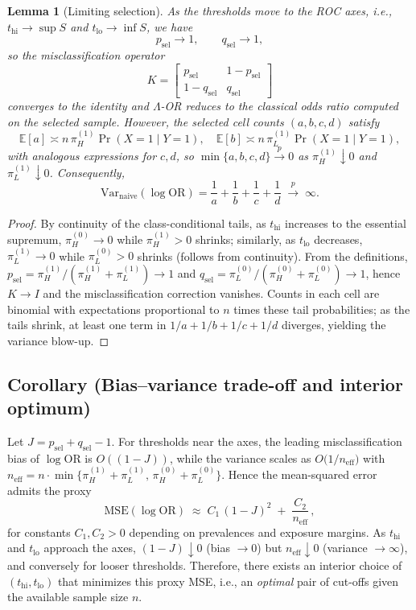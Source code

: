 \documentclass[pdflatex,sn-mathphys-num]{sn-jnl}%
\newtheorem{lem}{Lemma}
\theoremstyle{thmstyleone}%
\theoremstyle{thmstyletwo}%
\theoremstyle{thmstylethree}%
\begin{document}
\begin{lem}[Limiting selection]\label{lemsel}
As the thresholds move to the ROC axes, i.e., $t_{\mathrm{hi}}\!\to\!\sup S$ and $t_{\mathrm{lo}}\!\to\!\inf S$, we have
\[
p_{\text{sel}}\to 1,\qquad q_{\text{sel}}\to 1,
\]
so the misclassification operator
\[
K=\begin{bmatrix} p_{\text{sel}}&1-p_{\text{sel}}\\ 1-q_{\text{sel}}&q_{\text{sel}}\end{bmatrix}\]
converges to the identity and $\Lambda$-OR reduces to the classical odds ratio computed on the selected sample.
However, the selected cell counts $(a,b,c,d)$ satisfy
\[
\mathbb{E}[a]\asymp n\,\pi_H^{(1)}\Pr(X{=}1\mid Y{=}1),\quad
\mathbb{E}[b]\asymp n\,\pi_L^{(1)}\Pr(X{=}1\mid Y{=}1),
\]
with analogous expressions for $c,d$, so $\min\{a,b,c,d\}\stackrel{p}{\to}0$ as $\pi_H^{(1)}\!\downarrow 0$ and $\pi_L^{(1)}\!\downarrow 0$. Consequently,
\[
\mathrm{Var}_{\text{naive}}(\log\mathrm{OR})=\frac{1}{a}+\frac{1}{b}+\frac{1}{c}+\frac{1}{d}\;\xrightarrow{\;p\;}\;\infty.
\]
\end{lem}
\begin{proof}
By continuity of the class-conditional tails, as $t_{\mathrm{hi}}$ increases to the essential supremum,
$\pi_H^{(0)}\to 0$ while $\pi_H^{(1)}>0$ shrinks; similarly, as $t_{\mathrm{lo}}$ decreases,
$\pi_L^{(1)}\to 0$ while $\pi_L^{(0)}>0$ shrinks (follows from continuity). From the definitions,
$p_{\text{sel}}=\pi_H^{(1)}/(\pi_H^{(1)}+\pi_L^{(1)})\to 1$ and
$q_{\text{sel}}=\pi_L^{(0)}/(\pi_H^{(0)}+\pi_L^{(0)})\to 1$, hence $K\to I$ and
the misclassification correction vanishes. Counts in each cell are binomial with expectations proportional
to $n$ times these tail probabilities; as the tails shrink, at least one term in $1/a+1/b+1/c+1/d$
diverges, yielding the variance blow-up. 
\end{proof}

\subsection{Corollary (Bias–variance trade-off and interior optimum)}
Let $J=p_{\text{sel}}+q_{\text{sel}}-1$. For thresholds near the axes,
the leading misclassification bias of $\log\mathrm{OR}$ is $O((1-J))$, while the variance scales as
$O\!\big(1/n_{\text{eff}}\big)$ with $n_{\text{eff}}=n\cdot\min\{\pi_H^{(1)}+\pi_L^{(1)},\,\pi_H^{(0)}+\pi_L^{(0)}\}$.
Hence the mean-squared error admits the proxy
\[
\mathrm{MSE}(\log\mathrm{OR}) \;\approx\; C_1\,(1-J)^2 \;+\; \frac{C_2}{n_{\text{eff}}}\,,
\]
for constants $C_1,C_2>0$ depending on prevalences and exposure margins. As $t_{\mathrm{hi}}$ and $t_{\mathrm{lo}}$
approach the axes, $(1-J)\downarrow 0$ (bias $\to 0$) but $n_{\text{eff}}\downarrow 0$ (variance $\to\infty$),
and conversely for looser thresholds. Therefore, there exists an interior choice of $(t_{\mathrm{hi}},t_{\mathrm{lo}})$
that minimizes this proxy MSE, i.e., an \emph{optimal} pair of cut-offs given the available sample size $n$.
\end{document}

